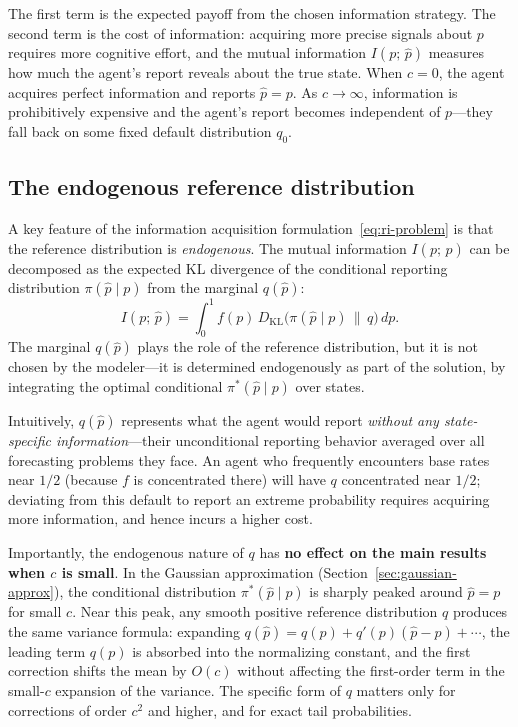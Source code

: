 \documentclass[11pt]{article}
\begin{document}
The first term is the expected payoff from the chosen information strategy. The second term is the cost of information: acquiring more precise signals about $p$ requires more cognitive effort, and the mutual information $I(p;\,\hat{p})$ measures how much the agent's report reveals about the true state. When $c = 0$, the agent acquires perfect information and reports $\hat{p} = p$. As $c \to \infty$, information is prohibitively expensive and the agent's report becomes independent of $p$---they fall back on some fixed default distribution $q_0$.

\subsection{The endogenous reference distribution}\label{sec:mu0}

A key feature of the information acquisition formulation~\eqref{eq:ri-problem} is that the reference distribution is \emph{endogenous}. The mutual information $I(p;\,\hat{p})$ can be decomposed as the expected KL divergence of the conditional reporting distribution $\pi(\hat{p} \mid p)$ from the marginal $q(\hat{p})$:
\[
I(p;\,\hat{p}) = \int_0^1 f(p)\, D_{\mathrm{KL}}\!\big(\pi(\hat{p} \mid p) \,\big\|\, q\big)\, dp.
\]
The marginal $q(\hat{p})$ plays the role of the reference distribution, but it is not chosen by the modeler---it is determined endogenously as part of the solution, by integrating the optimal conditional $\pi^*(\hat{p} \mid p)$ over states.

Intuitively, $q(\hat{p})$ represents what the agent would report \emph{without any state-specific information}---their unconditional reporting behavior averaged over all forecasting problems they face. An agent who frequently encounters base rates near $1/2$ (because $f$ is concentrated there) will have $q$ concentrated near $1/2$; deviating from this default to report an extreme probability requires acquiring more information, and hence incurs a higher cost.

Importantly, the endogenous nature of $q$ has \textbf{no effect on the main results when $c$ is small}. In the Gaussian approximation (Section~\ref{sec:gaussian-approx}), the conditional distribution $\pi^*(\hat{p} \mid p)$ is sharply peaked around $\hat{p} = p$ for small $c$. Near this peak, any smooth positive reference distribution $q$ produces the same variance formula: expanding $q(\hat{p}) = q(p) + q'(p)(\hat{p}-p) + \cdots$, the leading term $q(p)$ is absorbed into the normalizing constant, and the first correction shifts the mean by $O(c)$ without affecting the first-order term in the small-$c$ expansion of the variance. The specific form of $q$ matters only for corrections of order $c^2$ and higher, and for exact tail probabilities.
\end{document}
